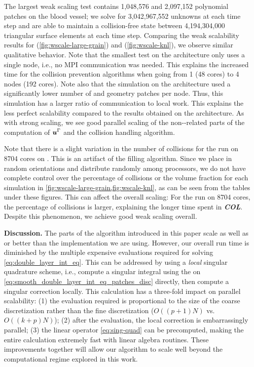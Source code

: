 The largest weak scaling test contains 1,048,576 \rbcs and 2,097,152 polynomial
patches on the blood vessel; we solve for 3,042,967,552 unknowns at each time
step and are able to maintain a collision-free state between
4,194,304,000 triangular surface elements at each time step.
Comparing the weak scalability results for 
(\cref{fig:wscale-large-grain}) and 
(\cref{fig:wscale-knl}), we observe similar qualitative
behavior. Note that the smallest test on the  architecture
only uses a single node, i.e., no MPI communication was needed. This
explains the increased time for the collision prevention algorithms when going
from 1 (48 cores) to 4 nodes (192 cores). 
Note also that the simulation on the  architecture
used a significantly lower number of \rbcs and geometry patches per
node. Thus, this simulation has a larger ratio of communication to
local work. This explains the less perfect scalability compared to
the results obtained on the  architecture.
As with strong scaling, we see good parallel scaling of the non-\fmm-related parts
of the computation of ${\bm{u}}^\Gamma$ and the collision handling algorithm.

Note that there is a slight variation in the number of collisions for
the run on 8704 cores on \knl.
This is an artifact of the \rbc filling algorithm.
Since we place \rbcs in random orientations and distribute \rbcs
randomly among processors, we do not have complete control over the percentage
of collisions or the volume fraction for each simulation in
\cref{fig:wscale-large-grain,fig:wscale-knl}, as can be seen from
the tables under these figures.
This can affect the overall scaling: For the run on 8704 cores, the
percentage of collisions is larger, explaining the longer
time spent in {\bf\em COL}.
Despite this phenomenon, we achieve good weak scaling overall.

\textbf{Discussion. }
The parts of the algorithm introduced in this paper scale as well as
or better than the \fmm implementation we are using.  However, our
overall run time is diminished by the multiple expensive
\fmm evaluations required for solving \cref{eq:double_layer_int_eq}.
This can be addressed by using a \textit{local} singular quadrature scheme,
i.e., compute a singular integral using the \fmm on
\cref{eq:smooth_double_layer_int_eq_patches_disc} directly, then compute a
singular correction locally.
This calculation has a three-fold impact on parallel scalability: (1) the \fmm
evaluation required is proportional to the size of the coarse discretization
rather than the fine discretization ($O((p+1)N)$ vs.\ $O((k+p)N)$);
(2) after the \fmm evaluation, the local correction is embarrassingly parallel;
(3) the linear operator \cref{eq:sing-quad} can be precomputed, making the
entire calculation extremely fast with  linear algebra routines.
These improvements together will allow our algorithm to scale well beyond the
computational regime explored in this work.

